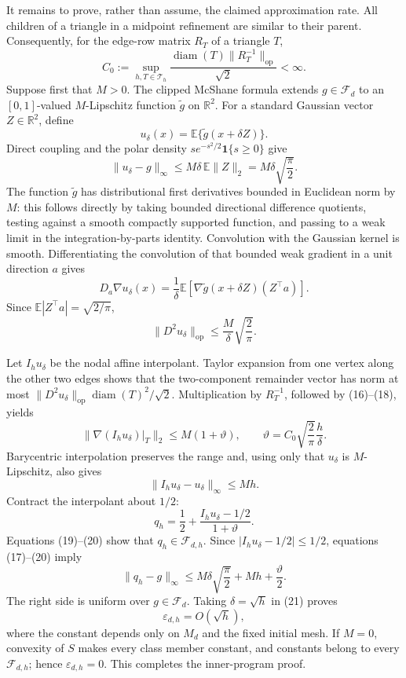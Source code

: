 It remains to prove, rather than assume, the claimed approximation rate.  All
children of a triangle in a midpoint refinement are similar to their parent.
Consequently, for the edge-row matrix \(R_T\) of a triangle \(T\),
\[
 C_0:=\sup_{h,T\in\mathcal T_h}
       \frac{\operatorname{diam}(T)\|R_T^{-1}\|_{\mathrm{op}}}{\sqrt2}<\infty.
                                                                    \tag{16}
\]
Suppose first that \(M>0\).  The clipped McShane formula extends
\(g\in\mathcal F_d\) to an \([0,1]\)-valued \(M\)-Lipschitz function
\(\widetilde g\) on \(\mathbb R^2\).  For a standard Gaussian vector
\(Z\in\mathbb R^2\), define
\[
 u_\delta(x)=\mathbb E\{\widetilde g(x+\delta Z)\}.
\]
Direct coupling and the polar density
\(s e^{-s^2/2}\mathbf 1\{s\ge0\}\) give
\[
 \|u_\delta-g\|_\infty
 \le M\delta\,\mathbb E\|Z\|_2
 =M\delta\sqrt{\frac\pi2}.                                \tag{17}
\]
The function \(\widetilde g\) has distributional first derivatives bounded in
Euclidean norm by \(M\): this follows directly by taking bounded directional
difference quotients, testing against a smooth compactly supported function,
and passing to a weak limit in the integration-by-parts identity.  Convolution
with the Gaussian kernel is smooth.  Differentiating the convolution of that
bounded weak gradient in a unit direction \(a\) gives
\[
 D_a\nabla u_\delta(x)
 =\frac1\delta\mathbb E\!\left[
       \nabla\widetilde g(x+\delta Z)(Z^\top a)\right].
\]
Since \(\mathbb E|Z^\top a|=\sqrt{2/\pi}\),
\[
 \|D^2u_\delta\|_{\mathrm{op}}
 \le\frac{M}{\delta}\sqrt{\frac2\pi}.                     \tag{18}
\]

Let \(I_hu_\delta\) be the nodal affine interpolant.  Taylor expansion from one
vertex along the other two edges shows that the two-component remainder vector
has norm at most
\(\|D^2u_\delta\|_{\mathrm{op}}\operatorname{diam}(T)^2/\sqrt2\).
Multiplication by \(R_T^{-1}\), followed by (16)--(18), yields
\[
 \|\nabla(I_hu_\delta)|_T\|_2\le M(1+\vartheta),
 \qquad
 \vartheta=C_0\sqrt{\frac2\pi}\frac h\delta.              \tag{19}
\]
Barycentric interpolation preserves the range and, using only that
\(u_\delta\) is \(M\)-Lipschitz, also gives
\[
 \|I_hu_\delta-u_\delta\|_\infty\le Mh.                    \tag{20}
\]
Contract the interpolant about \(1/2\):
\[
 q_h=\frac12+\frac{I_hu_\delta-1/2}{1+\vartheta}.
\]
Equations (19)--(20) show that \(q_h\in\mathcal F_{d,h}\).  Since
\(|I_hu_\delta-1/2|\le1/2\), equations (17)--(20) imply
\[
 \|q_h-g\|_\infty
 \le M\delta\sqrt{\frac\pi2}+Mh+\frac{\vartheta}{2}.       \tag{21}
\]
The right side is uniform over \(g\in\mathcal F_d\).  Taking
\(\delta=\sqrt h\) in (21) proves
\[
 \varepsilon_{d,h}=O(\sqrt h),                              \tag{22}
\]
where the constant depends only on \(M_d\) and the fixed initial mesh.  If
\(M=0\), convexity of \(S\) makes every class member constant, and constants
belong to every \(\mathcal F_{d,h}\); hence
\(\varepsilon_{d,h}=0\).  This completes the inner-program proof.

